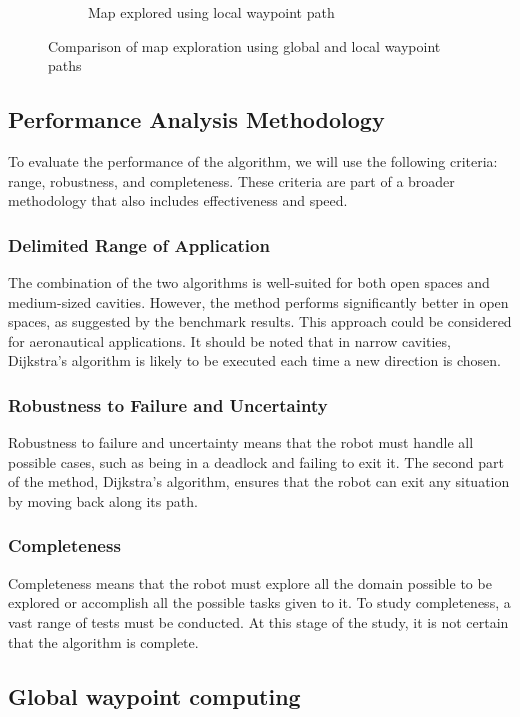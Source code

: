 \documentclass[../main.tex]{subfiles}
\begin{document}
\begin{figure}[H]
\begin{subfigure}[b]{0.45\textwidth}
		\caption{Map explored using local waypoint path}
		\label{fig:map_explored_using_lwp}
	\end{subfigure}
	\caption{Comparison of map exploration using global and local waypoint paths}
	\label{fig:map_exploration_comparison}
\end{figure}


\subsection{Performance Analysis Methodology}

To evaluate the performance of the algorithm, we will use the following criteria: range, robustness, and completeness. These criteria are part of a broader methodology that also includes effectiveness and speed.

\subsubsection{Delimited Range of Application}
The combination of the two algorithms is well-suited for both open spaces and medium-sized cavities. However, the method performs significantly better in open spaces, as suggested by the benchmark results. This approach could be considered for aeronautical applications. It should be noted that in narrow cavities, Dijkstra's algorithm is likely to be executed each time a new direction is chosen.

\subsubsection{Robustness to Failure and Uncertainty}
Robustness to failure and uncertainty means that the robot must handle all possible cases, such as being in a deadlock and failing to exit it. The second part of the method, Dijkstra's algorithm, ensures that the robot can exit any situation by moving back along its path.

\subsubsection{Completeness}
Completeness means that the robot must explore all the domain possible to be explored or accomplish all the possible tasks given to it. To study completeness, a vast range of tests must be conducted. At this stage of the study, it is not certain that the algorithm is complete.

\subsection{Global waypoint computing}
\end{document}
